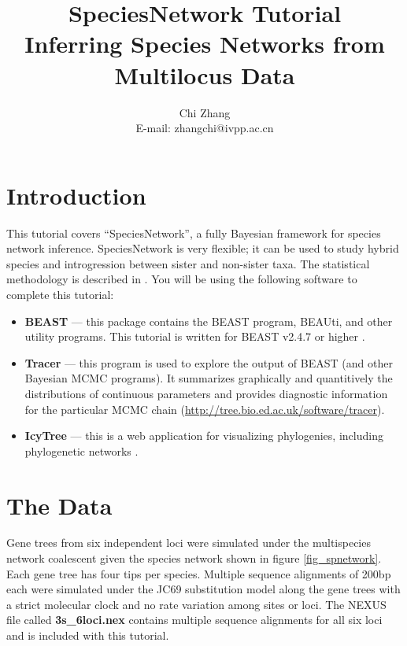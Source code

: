 \documentclass[11pt]{article}
\begin{document}
\title{SpeciesNetwork Tutorial \\
\large Inferring Species Networks from Multilocus Data}
\author{Chi Zhang \\
E-mail: zhangchi@ivpp.ac.cn}
\maketitle

\section*{Introduction}

This tutorial covers ``SpeciesNetwork'', a fully Bayesian framework for
species network inference. SpeciesNetwork is very flexible; it can be used to
study hybrid species and introgression between sister and non-sister taxa. The
statistical methodology is described in \citet{Zhang:2017gq}. You will be
using the following software to complete this tutorial:

\begin{itemize}
\item \textbf{BEAST} --- this package contains the BEAST program, BEAUti, and other utility programs. This tutorial is written for BEAST v2.4.7 or higher \citep[\url{http://beast2.org},][]{Bouckaert:2014iz}.
\item \textbf{Tracer} --- this program is used to explore the output of BEAST (and other Bayesian MCMC programs). It summarizes graphically and quantitively the distributions of continuous parameters and provides diagnostic information for the particular MCMC chain (\url{http://tree.bio.ed.ac.uk/software/tracer}).
\item \textbf{IcyTree} --- this is a web application for visualizing phylogenies, including phylogenetic networks \citep[\url{icytree.org};][]{Vaughan:2017fu}.
\end{itemize}

\section*{The Data}

Gene trees from six independent loci were simulated under the multispecies network coalescent \citep[MSNC;][]{Yu:2014dt} given the species network shown in figure \ref{fig_spnetwork}. Each gene tree has four tips per species. Multiple sequence alignments of 200bp each were simulated under the JC69 substitution model \citep{Jukes:1969wx} along the gene trees with a strict molecular clock and no rate variation among sites or loci. The NEXUS file called \textbf{3s\_6loci.nex} contains multiple sequence alignments for all six loci and is included with this tutorial.
\end{document}
